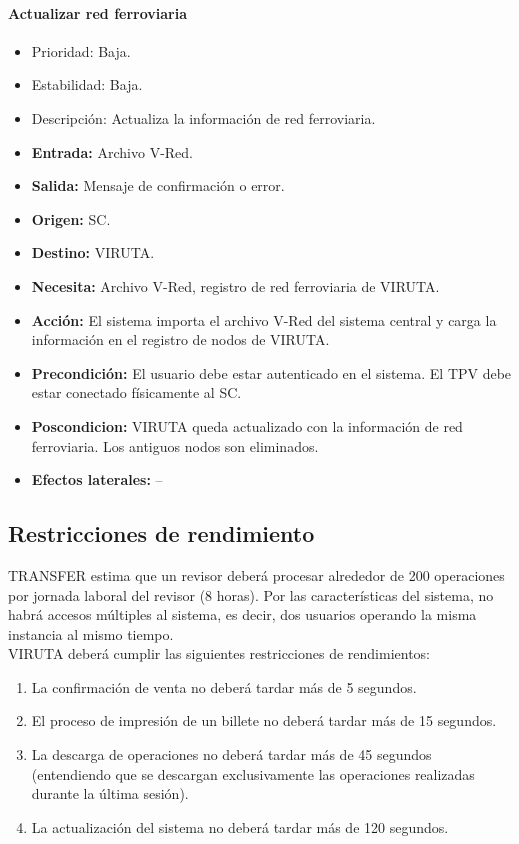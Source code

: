 \paragraph{Actualizar red ferroviaria}

\begin{itemize}
\item Prioridad: Baja.
\item Estabilidad: Baja.
\item Descripción: Actualiza la información de red ferroviaria.
\item  \textbf{Entrada:} Archivo V-Red.
\item \textbf{Salida:} Mensaje de confirmación o error.
\item \textbf{Origen:} SC.
\item \textbf{Destino:} VIRUTA.
\item \textbf{Necesita:} Archivo V-Red, registro de red ferroviaria de VIRUTA.
\item \textbf{Acción:} El sistema importa el archivo V-Red del sistema central y carga la información en el registro de nodos de VIRUTA.
\item \textbf{Precondición:} El usuario debe estar autenticado en el sistema. El TPV debe estar conectado físicamente al SC.
\item \textbf{Poscondicion:} VIRUTA queda actualizado con la información de red ferroviaria. Los antiguos nodos son eliminados.
\item \textbf{Efectos laterales:} --
\end{itemize}

\subsection{Restricciones de rendimiento}

TRANSFER estima que un revisor deberá procesar alrededor de 200 operaciones por jornada laboral del revisor (8 horas).
Por las características del sistema, no habrá accesos múltiples al sistema, es decir, dos usuarios operando la misma instancia al mismo tiempo.\\

VIRUTA deberá cumplir las siguientes restricciones de rendimientos:

\begin{enumerate}
\item La confirmación de venta no deberá tardar más de 5 segundos.
\item El proceso de impresión de un billete no deberá tardar más de 15 segundos.
\item La descarga de operaciones no deberá tardar más de 45 segundos (entendiendo que se descargan exclusivamente las operaciones realizadas durante la última sesión).
\item La actualización del sistema no deberá tardar más de 120 segundos.
\end{enumerate}

